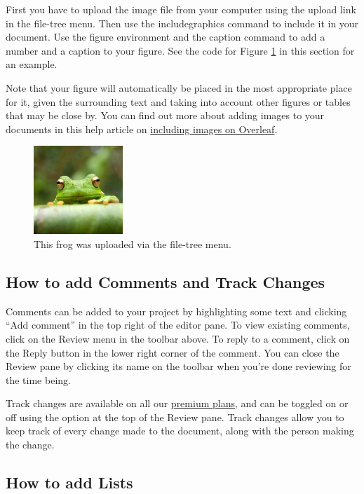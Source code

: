 \documentclass{article}
\begin{document}
First you have to upload the image file from your computer using the upload link in the file-tree menu. Then use the includegraphics command to include it in your document. Use the figure environment and the caption command to add a number and a caption to your figure. See the code for Figure \ref{fig:frog} in this section for an example.

Note that your figure will automatically be placed in the most appropriate place for it, given the surrounding text and taking into account other figures or tables that may be close by. You can find out more about adding images to your documents in this help article on \href{https://www.overleaf.com/learn/how-to/Including_images_on_Overleaf}{including images on Overleaf}.

\begin{figure}
\centering
\includegraphics[width=0.3\textwidth]{frog.jpg}
\caption{\label{fig:frog}This frog was uploaded via the file-tree menu.}
\end{figure}

\subsection{How to add Comments and Track Changes}

Comments can be added to your project by highlighting some text and clicking ``Add comment'' in the top right of the editor pane. To view existing comments, click on the Review menu in the toolbar above. To reply to a comment, click on the Reply button in the lower right corner of the comment. You can close the Review pane by clicking its name on the toolbar when you're done reviewing for the time being.

Track changes are available on all our \href{https://www.overleaf.com/user/subscription/plans}{premium plans}, and can be toggled on or off using the option at the top of the Review pane. Track changes allow you to keep track of every change made to the document, along with the person making the change. 

\subsection{How to add Lists}
\end{document}
